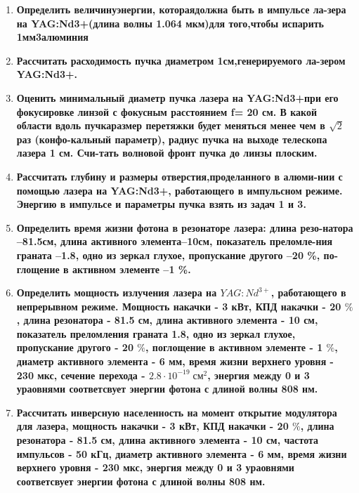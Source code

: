 \documentclass[a4paper]{article}
\begin{document}
\begin{enumerate}
	\item \textbf{Определить величинуэнергии, котораядолжна быть в импульсе ла-зера  на YAG:Nd3+(длина  волны  1.064  мкм)для  того,чтобы испарить 1мм3алюминия} \par
	\item \textbf{Рассчитать расходимость пучка диаметром 1см,генерируемого ла-зером YAG:Nd3+.} \par
	\item \textbf{Оценить минимальный диаметр пучка лазера на YAG:Nd3+при его фокусировке линзой с фокусным расстоянием f= 20 см. В какой области вдоль пучкаразмер перетяжки будет меняться менее чем в $\sqrt{2}$ раз (конфо-кальный параметр), радиус пучка на выходе телескопа лазера 1 см. Счи-тать волновой фронт пучка до линзы плоским.} \par 
	\item \textbf{Рассчитать глубину и размеры отверстия,проделанного в алюми-нии с помощью лазера на YAG:Nd3+, работающего в импульсном режиме. Энергию в импульсе и параметры пучка взять из задач 1 и 3.} \par 
	\item \textbf{Определить время жизни фотона в резонаторе лазера: длина резо-натора –81.5см, длина активного элемента–10см, показатель преломле-ния граната –1.8, одно из зеркал глухое, пропускание другого –20 \%, по-глощение в активном элементе –1 \%.} \par 
	\item \textbf{Определить мощность излучения лазера на $YAG:Nd^{3+}$, работающего в непрерывном режиме. Мощность накачки - 3 кВт, КПД накачки - 20 $\%$, длина резонатора - 81.5 см, длина активного элемента - 10 см, показатель преломления граната 1.8, одно из зеркал глухое, пропускание другого - 20 $\%$, поглощение в активном элементе - 1 $\%$, диаметр активного элемента - 6 мм, время жизни верхнего уровня - 230 мкс, сечение перехода - $2.8 \cdot 10^{-19}\;см^{2}$, энергия между 0 и 3 ураовнями соответсвует энергии фотона с длиной волны 808 нм.} \par 
	\item \textbf{Рассчитать инверсную населенность на момент открытие модулятора для лазера, мощность накачки - 3 кВт, КПД накачки - 20 $\%$, длина резонатора - 81.5 см, длина активного элемента - 10 см, частота импульсов - 50 кГц, диаметр активного элемента - 6 мм, время жизни верхнего уровня - 230 мкс, энергия между 0 и 3 ураовнями соответсвует энергии фотона с длиной волны 808 нм.} \par 

\end{enumerate}
\end{document}
